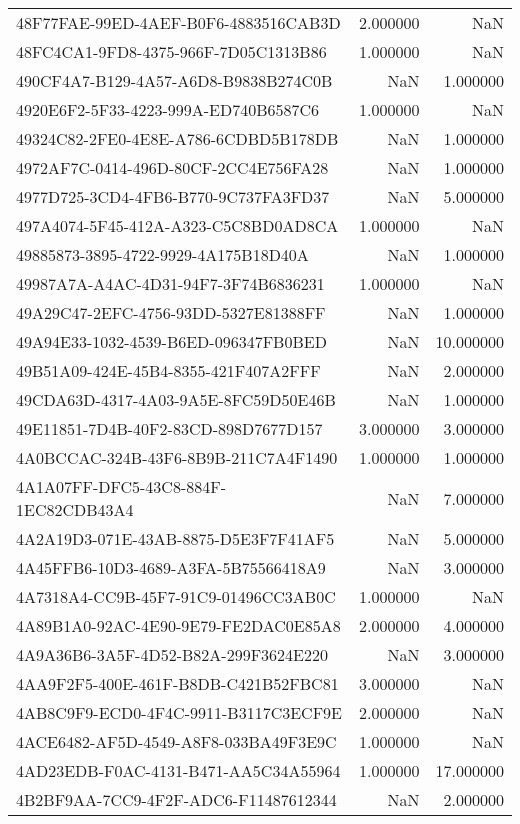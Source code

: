 \begin{tabular}{lrr}
48F77FAE-99ED-4AEF-B0F6-4883516CAB3D & 2.000000 & NaN \\
48FC4CA1-9FD8-4375-966F-7D05C1313B86 & 1.000000 & NaN \\
490CF4A7-B129-4A57-A6D8-B9838B274C0B & NaN & 1.000000 \\
4920E6F2-5F33-4223-999A-ED740B6587C6 & 1.000000 & NaN \\
49324C82-2FE0-4E8E-A786-6CDBD5B178DB & NaN & 1.000000 \\
4972AF7C-0414-496D-80CF-2CC4E756FA28 & NaN & 1.000000 \\
4977D725-3CD4-4FB6-B770-9C737FA3FD37 & NaN & 5.000000 \\
497A4074-5F45-412A-A323-C5C8BD0AD8CA & 1.000000 & NaN \\
49885873-3895-4722-9929-4A175B18D40A & NaN & 1.000000 \\
49987A7A-A4AC-4D31-94F7-3F74B6836231 & 1.000000 & NaN \\
49A29C47-2EFC-4756-93DD-5327E81388FF & NaN & 1.000000 \\
49A94E33-1032-4539-B6ED-096347FB0BED & NaN & 10.000000 \\
49B51A09-424E-45B4-8355-421F407A2FFF & NaN & 2.000000 \\
49CDA63D-4317-4A03-9A5E-8FC59D50E46B & NaN & 1.000000 \\
49E11851-7D4B-40F2-83CD-898D7677D157 & 3.000000 & 3.000000 \\
4A0BCCAC-324B-43F6-8B9B-211C7A4F1490 & 1.000000 & 1.000000 \\
4A1A07FF-DFC5-43C8-884F-1EC82CDB43A4 & NaN & 7.000000 \\
4A2A19D3-071E-43AB-8875-D5E3F7F41AF5 & NaN & 5.000000 \\
4A45FFB6-10D3-4689-A3FA-5B75566418A9 & NaN & 3.000000 \\
4A7318A4-CC9B-45F7-91C9-01496CC3AB0C & 1.000000 & NaN \\
4A89B1A0-92AC-4E90-9E79-FE2DAC0E85A8 & 2.000000 & 4.000000 \\
4A9A36B6-3A5F-4D52-B82A-299F3624E220 & NaN & 3.000000 \\
4AA9F2F5-400E-461F-B8DB-C421B52FBC81 & 3.000000 & NaN \\
4AB8C9F9-ECD0-4F4C-9911-B3117C3ECF9E & 2.000000 & NaN \\
4ACE6482-AF5D-4549-A8F8-033BA49F3E9C & 1.000000 & NaN \\
4AD23EDB-F0AC-4131-B471-AA5C34A55964 & 1.000000 & 17.000000 \\
4B2BF9AA-7CC9-4F2F-ADC6-F11487612344 & NaN & 2.000000 \\

\end{tabular}
